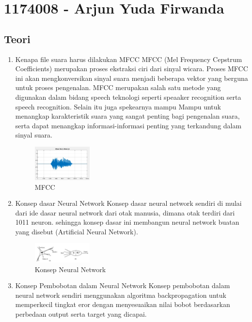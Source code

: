 \section{1174008 - Arjun Yuda Firwanda}

\subsection{Teori}
\begin{enumerate}

        \item Kenapa file suara harus dilakukan MFCC
MFCC (Mel Frequency Cepstrum Coefficients) merupakan proses ekstraksi ciri dari sinyal wicara. Proses MFCC ini akan mengkonversikan sinyal suara menjadi beberapa vektor yang berguna untuk proses pengenalan. MFCC merupakan salah satu metode yang digunakan dalam bidang speech teknologi seperti speaaker recognition serta speech recognition. Selain itu juga spekearnya mampu Mampu untuk menangkap karakteristik suara yang sangat penting bagi pengenalan suara, serta dapat menangkap informasi-informasi penting yang terkandung dalam sinyal suara.

	\begin{figure}[H]
            	\includegraphics[width=3cm]{figures/1174008/6/teori1.PNG}
           	 \centering
           	 \caption{MFCC}
        	\end{figure}

        \item Konsep dasar Neural Network
Konsep dasar neural network sendiri di mulai dari ide dasar neural network dari otak manusia, dimana otak terdiri dari 1011 neuron. sehingga konsep dasar ini membangun neural network buatan yang disebut (Artificial Neural Network).

	\begin{figure}[H]
		\includegraphics[width=3cm]{figures/1174008/6/teori2.PNG}
            	\centering
           	 \caption{Konsep Neural Network}
       	 \end{figure}

        \item Konsep Pembobotan dalam Neural Network
Konsep pembobotan dalam neural network sendiri menggunakan algoritma backpropagation untuk memperkecil tingkat eror dengan menyesuaikan nilai bobot berdasarkan perbedaan output serta target yang dicapai.


\end{enumerate}
